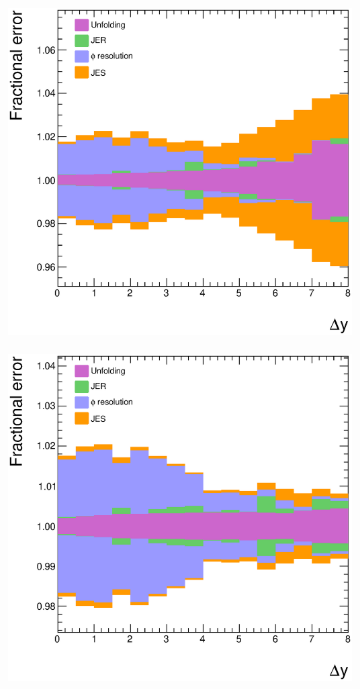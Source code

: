 \begin{figure}
\centering
        \begin{subfigure}[b]{0.5\textwidth}
                \centering
                \includegraphics[width=\textwidth]{figures/GBJ2/FinalPlots/CosTwoDeltaPhiInclusive_dyBins.systematics.eps}
        \end{subfigure}%
        \begin{subfigure}[b]{0.5\textwidth}
                \centering
                \includegraphics[width=\textwidth]{figures/GBJ2/FinalPlots/CosTwoDeltaPhiGap_dyBins.systematics.eps}

\end{subfigure}
\end{figure}
